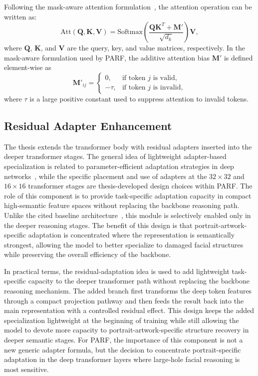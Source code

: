 \documentclass[12pt, twoside]{report}
\begin{document}
Following the mask-aware attention formulation~\cite{li2022mat}, the attention operation can be written as:
\begin{equation}
\mathrm{Att}(\mathbf{Q}, \mathbf{K}, \mathbf{V}) =
\mathrm{Softmax}\left(\frac{\mathbf{Q}\mathbf{K}^T + \mathbf{M}'}{\sqrt{d_k}}\right)\mathbf{V},
\end{equation}
where $\mathbf{Q}$, $\mathbf{K}$, and $\mathbf{V}$ are the query, key, and value matrices, respectively. In the mask-aware formulation used by PARF, the additive attention bias $\mathbf{M}'$ is defined element-wise as
\begin{equation}
\mathbf{M}'_{ij} =
\begin{cases}
0, & \text{if token } j \text{ is valid},\\
-\tau, & \text{if token } j \text{ is invalid},
\end{cases}
\end{equation}
where $\tau$ is a large positive constant used to suppress attention to invalid tokens.

\subsection{Residual Adapter Enhancement}

The thesis extends the transformer body with residual adapters inserted into the deeper transformer stages. The general idea of lightweight adapter-based specialization is related to parameter-efficient adaptation strategies in deep networks~\cite{houlsby2019parameter}, while the specific placement and use of adapters at the $32\times32$ and $16\times16$ transformer stages are thesis-developed design choices within PARF. The role of this component is to provide task-specific adaptation capacity in compact high-semantic feature spaces without replacing the backbone reasoning path. Unlike the cited baseline architecture~\cite{li2022mat}, this module is selectively enabled only in the deeper reasoning stages. The benefit of this design is that portrait-artwork-specific adaptation is concentrated where the representation is semantically strongest, allowing the model to better specialize to damaged facial structures while preserving the overall efficiency of the backbone.

In practical terms, the residual-adaptation idea is used to add lightweight task-specific capacity to the deeper transformer path without replacing the backbone reasoning mechanism. The added branch first transforms the deep token features through a compact projection pathway and then feeds the result back into the main representation with a controlled residual effect. This design keeps the added specialization lightweight at the beginning of training while still allowing the model to devote more capacity to portrait-artwork-specific structure recovery in deeper semantic stages. For PARF, the importance of this component is not a new generic adapter formula, but the decision to concentrate portrait-specific adaptation in the deep transformer layers where large-hole facial reasoning is most sensitive.
\end{document}
